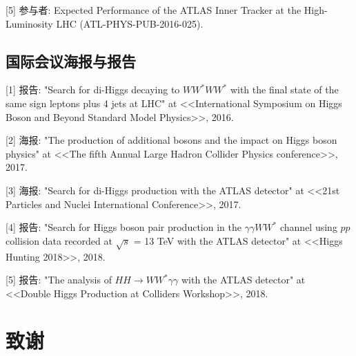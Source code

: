[5] 参与者: Expected Performance of the ATLAS Inner Tracker at the High-Luminosity LHC (ATL-PHYS-PUB-2016-025).

\section*{国际会议海报与报告}
[1] 报告: "Search for di-Higgs decaying to $WW^*WW^*$ with the final state of the same sign leptons plus 4 jets at LHC" at <<International Symposium on Higgs Boson and Beyond Standard Model Physics>>, 2016.

[2] 海报: "The production of additional bosons and the impact on Higgs boson physics" at <<The fifth Annual Large Hadron Collider Physics conference>>, 2017.

[3] 海报: "Search for di-Higgs production with the ATLAS detector" at  <<21st Particles and Nuclei International Conference>>, 2017.

[4] 报告: "Search for Higgs boson pair production in the $\gamma\gamma WW^*$ channel using $pp$ collision data recorded at $\sqrt{s}$ = 13 TeV with the ATLAS detector" at <<Higgs Hunting 2018>>, 2018.

[5] 报告: "The analysis of $HH\rightarrow WW^*\gamma\gamma$ with the ATLAS detector" at <<Double Higgs Production at Colliders Workshop>>, 2018.




\chapter[致谢]{致\quad 谢}%
\thispagestyle{noheaderstyle}%

%

\cleardoublepage[plain]%

